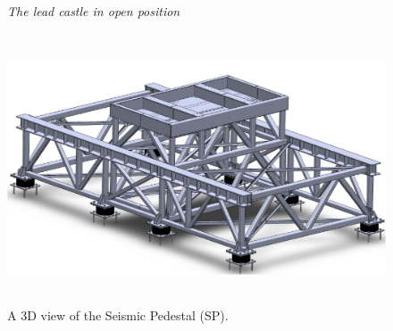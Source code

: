 \begin{figure}[hpt!]
    \bigskip
    \begin{center}\leavevmode
        \caption{\textit{The lead castle in open position}}
        \label{fig:F4:F4}
    \end{center}
\end{figure}

\begin{figure}[hpt!]
\centering
\includegraphics[height=8cm]{img/SeismicPedestal.pdf}
\caption{A 3D view of the Seismic Pedestal (SP).} \label{fig:seismicPedestal3D}
\end{figure}



%


